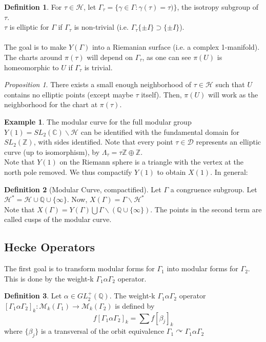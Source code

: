 \documentclass[11pt]{article}
\theoremstyle{definition}
\newtheorem{definition}{Definition}[section]
\theoremstyle{example}
\newtheorem{example}{Example}[section]
\theoremstyle{remark}
\theoremstyle{lemma}
\theoremstyle{proposition}
\newtheorem{proposition}{Proposition}[section]
\theoremstyle{Problem}
\theoremstyle{Solution}
\theoremstyle{theorem}
\begin{document}
\begin{definition}
For $\tau\in \mathcal{H}$, let $\Gamma_\tau = \{ \gamma \in \Gamma : \gamma(\tau) = \tau) \}$, the isotropy subgroup of $\tau$.\\
$\tau$ is elliptic for $\Gamma$ if $\Gamma_\tau$ is non-trivial (i.e. $\Gamma_\tau \{\pm I\} \supset \{\pm I\}$).\\ \\

The goal is to make $Y(\Gamma)$ into a Riemanian surface (i.e. a complex 1-manifold). The charts around $\pi(\tau)$ will depend on $\Gamma_\tau$, as one can see $\pi(U)$ is homeomorphic to $U$ if $\Gamma_\tau$ is trivial.
\end{definition}
\begin{proposition}
There exists a small enough neighborhood of $\tau \in \mathcal{H}$ such that $U$ contains no elliptic points (except maybe $\tau$ itself). Then, $\pi(U)$ will work as the neighborhood for the chart at $\pi(\tau)$.
\end{proposition}

\begin{example}
The modular curve for the full modular group $Y(1) = SL_2(\mathbb{C})\backslash \mathcal{H}$ can be identified with the fundamental domain for $SL_2(\mathbb{Z})$, with sides identified.
Note that every point $\tau \in \mathcal{D}$ represents an elliptic curve (up to isomorphism), by $\Lambda_\tau = \tau\mathbb{Z}\oplus\mathbb{Z}$.\\
Note that $Y(1)$ on the Riemann sphere is a triangle with the vertex at the north pole removed. We thus compactify $Y(1)$ to obtain $X(1)$. In general:
\end{example}

\begin{definition}[Modular Curve, compactified]
Let $\Gamma$ a congruence subgroup. Let $\mathcal{H}^* = \mathcal{H}\cup \mathbb{Q}\cup \{\infty\}$. Now, $X(\Gamma) = \Gamma\backslash\mathcal{H}^*$\\
 Note that $X(\Gamma) = Y(\Gamma) \bigcup \Gamma\backslash(\mathbb{Q}\cup\{\infty\})$. The points in the second term are called cusps of the modular curve.
\end{definition}




\subsection{Hecke Operators}
The first goal is to transform modular forms for $\Gamma_1$ into modular forms for $\Gamma_2$. This is done by the weight-k $\Gamma_1\alpha\Gamma_2$ operator. 
\begin{definition}
Let $\alpha\in GL_2^+(\mathbb{Q})$. The weight-k $\Gamma_1\alpha\Gamma_2$ operator $[\Gamma_1\alpha\Gamma_2]_k : \mathcal{M}_k(\Gamma_1) \to \mathcal{M}_k(\Gamma_2)$ is defined by
$$ f[\Gamma_1\alpha\Gamma_2]_k = \sum f[\beta_j]_k$$
where $\{\beta_j\}$ is a transversal of the orbit equivalence $\Gamma_1\curvearrowright\Gamma_1\alpha\Gamma_2$
\end{definition}
\end{document}
